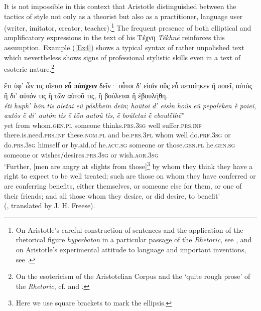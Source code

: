 \documentclass[output=paper,colorlinks,citecolor=brown]{langscibook}
\begin{document}
It is not impossible in this context that Aristotle distinguished between the tactics of style not only as a theorist but also as a practitioner, language user (writer, imitator, creator, teacher).\footnote{On Aristotle’s careful construction of sentences and the application of the rhetorical figure \textit{hyperbaton} in a particular passage of the \textit{Rhetoric}, see \citet{Martin2001}, and on Aristotle’s experimental attitude to language and important inventions, see \citet{Allan2004}.} The frequent presence of both elliptical and amplificatory expressions in the text of his Τέχνη \textit{Tékhnē} reinforces this assumption. Example (\ref{Ex4}) shows a typical syntax of rather unpolished text which nevertheless shows signs of professional stylistic skills even in a text of esoteric nature.\footnote{On the esotericism of the Aristotelian Corpus and the ‘quite rough prose' of the \textit{Rhetoric}, cf. \citet{Poster1997} and \citet[3]{Kennedy2007}.}

\largerpage
\ea\label{Ex4}
	\glll ἔτι ὑφ’ ὧν τις οἴεται \textbf{εὖ} \textbf{πάσχειν} δεῖν· οὗτοι δ' εἰσὶν οὓς εὖ πεποίηκεν ἢ ποιεῖ, αὐτὸς ἢ δι’ αὐτόν τις ἢ τῶν αὐτοῦ τις, ἢ βούλεται ἢ ἐβουλήθη.\\
    \textit{éti} \textit{huph᾽} \textit{hō̃n} \textit{tis} \textit{oíetai} \textit{eũ} \textit{páskhein} \textit{deĩn}; \textit{hoũtoi} \textit{d᾽} \textit{eisìn} \textit{hoùs} \textit{eũ} \textit{pepoíēken} \textit{ḕ} \textit{poieĩ}, \textit{autòs} \textit{ḕ} \textit{di᾽} \textit{autón} \textit{tis} \textit{ḕ} \textit{tō̃n} \textit{autoũ} \textit{tis}, \textit{ḕ} \textit{boúletai} \textit{ḕ} \textit{eboulḗthē}”\\
	yet from whom.\textsc{gen.pl} someone thinks.\textsc{prs.3sg} well suffer.\textsc{prs.inf} there.is.need.\textsc{prs.inf} these.\textsc{nom.pl} and   be.\textsc{prs.3pl} whom well do.\textsc{prf.3sg} or do.\textsc{prs.3sg} himself or by.aid.of he.\textsc{acc.sg} someone or those.\textsc{gen.pl} he.\textsc{gen.sg} someone or wishes/desires.\textsc{prs.3sg} or wish.\textsc{aor.3sg}\\
	\glt ‘Further, [men are angry at slights from those]\footnote{Here we use square brackets to mark the ellipsis.} by whom they think they have a right to expect to be well treated; such are those on whom they have conferred or are conferring benefits, either themselves, or someone else for them, or one of their friends; and all those whom they desire, or did desire, to benefit' \\
 \hspace*{\fill}(, translated by J. H. Freese).
\z
\end{document}
